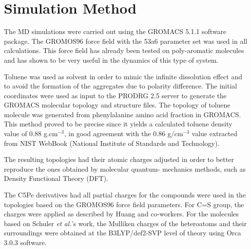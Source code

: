 \section{Simulation Method}

The MD simulations were carried out using the GROMACS 5.1.1 software package.\cite{berendsen1995gromacs,hess2008gromacs,van2005gromacs} The GROMOS96 force field\cite{van1998gromos} with the 53a6 parameter set\cite{oostenbrink2004biomolecular} was used in all calculations. This force field has already been tested on poly-aromatic molecules and has shown to be very useful in the dynamics of this type of system.\cite{teklebrhan2014initial,kuznicki2008molecular,kuznicki2009aggregation,teklebrhan2012probing}

Toluene was used as solvent in order to mimic the infinite dissolution effect and to avoid the formation of the aggregates due to polarity difference. The initial coordinates were used as input to the PRODRG 2.5 server\cite{schuettelkopf2004prodrg} to generate the GROMACS molecular topology and structure files. The topology of toluene molecule was generated from phenylalanine amino acid fraction in GROMACS. This method proved to be precise since it yields a calculated toluene density value of 0.88 g.cm$^{-3}$, in good agreement with the 0.86 g/cm$^{-3}$ value extracted from NIST WebBook (National Institute of Standards and Technology).\cite{nist}

The resulting topologies had their atomic charges adjusted in order to better reproduce the ones obtained by molecular quantum- mechanics methods, such as Density Functional Theory (DFT). 

The C5Pe derivatives had all partial charges for the compounds were used in the topologies based on the GROMOS96 force field parameters. For C=S group, the charges were applied as described by Huang and co-workers.\cite{huang2012molecular} For the molecules based on Schuler \textit{et al.}'s work, the Mulliken charges of the heteroatoms and their surroundings were obtained at the B3LYP/def2-SVP level of theory \cite{becke1993density,lee1988development,stephens1994ab,schafer1992fully,weigend2005balanced} using Orca 3.0.3 software\cite{neese2012orca}.\\

